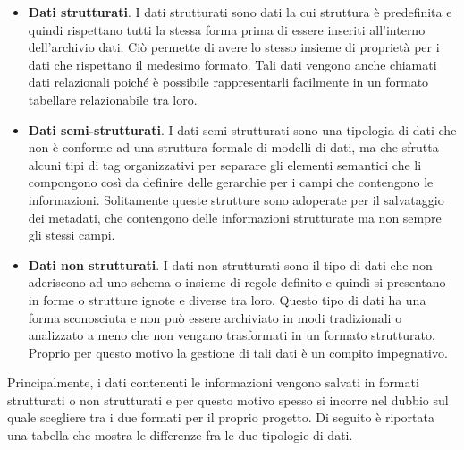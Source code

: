 \begin{itemize}
    \item \textbf{Dati strutturati}. I dati strutturati sono dati la cui struttura è predefinita e quindi rispettano tutti la stessa forma prima di essere inseriti all'interno dell'archivio dati. Ciò permette di avere lo stesso insieme di proprietà per i dati che rispettano il medesimo formato. Tali dati vengono anche chiamati dati relazionali poiché è possibile rappresentarli facilmente in un formato tabellare relazionabile tra loro.
    \item \textbf{Dati semi-strutturati}. I dati semi-strutturati sono una tipologia di dati che non è conforme ad una struttura formale di modelli di dati, ma che sfrutta alcuni tipi di tag organizzativi per separare gli elementi semantici che li compongono così da definire delle gerarchie per i campi che contengono le informazioni. Solitamente queste strutture sono adoperate per il salvataggio dei metadati, che contengono delle informazioni strutturate ma non sempre gli stessi campi.
    \item \textbf{Dati non strutturati}. I dati non strutturati sono il tipo di dati che non aderiscono ad uno schema o insieme di regole definito e quindi si presentano in forme o strutture ignote e diverse tra loro. Questo tipo di dati ha una forma sconosciuta e non può essere archiviato in modi tradizionali o analizzato a meno che non vengano trasformati in un formato strutturato. Proprio per questo motivo la gestione di tali dati è un compito impegnativo.
\end{itemize}

Principalmente, i dati contenenti le informazioni vengono salvati in formati strutturati o non strutturati e per questo motivo spesso si incorre nel dubbio sul quale scegliere tra i due formati per il proprio progetto. Di seguito è riportata una tabella che mostra le differenze fra le due tipologie di dati.

